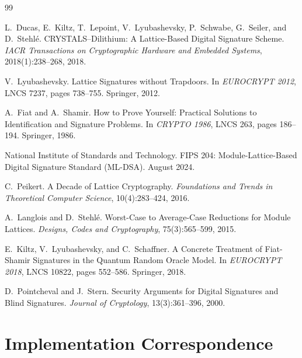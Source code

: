 \documentclass[11pt,a4paper]{article}
\theoremstyle{definition}
\begin{document}
\begin{thebibliography}{99}

L.~Ducas, E.~Kiltz, T.~Lepoint, V.~Lyubashevsky, P.~Schwabe, G.~Seiler, and D.~Stehl\'{e}.
\newblock CRYSTALS--Dilithium: A Lattice-Based Digital Signature Scheme.
\newblock \textit{IACR Transactions on Cryptographic Hardware and Embedded Systems}, 2018(1):238--268, 2018.

V.~Lyubashevsky.
\newblock Lattice Signatures without Trapdoors.
\newblock In \textit{EUROCRYPT 2012}, LNCS 7237, pages 738--755. Springer, 2012.

A.~Fiat and A.~Shamir.
\newblock How to Prove Yourself: Practical Solutions to Identification and Signature Problems.
\newblock In \textit{CRYPTO 1986}, LNCS 263, pages 186--194. Springer, 1986.

National Institute of Standards and Technology.
\newblock FIPS 204: Module-Lattice-Based Digital Signature Standard (ML-DSA).
\newblock August 2024.

C.~Peikert.
\newblock A Decade of Lattice Cryptography.
\newblock \textit{Foundations and Trends in Theoretical Computer Science}, 10(4):283--424, 2016.

A.~Langlois and D.~Stehl\'{e}.
\newblock Worst-Case to Average-Case Reductions for Module Lattices.
\newblock \textit{Designs, Codes and Cryptography}, 75(3):565--599, 2015.

E.~Kiltz, V.~Lyubashevsky, and C.~Schaffner.
\newblock A Concrete Treatment of Fiat-Shamir Signatures in the Quantum Random Oracle Model.
\newblock In \textit{EUROCRYPT 2018}, LNCS 10822, pages 552--586. Springer, 2018.

D.~Pointcheval and J.~Stern.
\newblock Security Arguments for Digital Signatures and Blind Signatures.
\newblock \textit{Journal of Cryptology}, 13(3):361--396, 2000.

\end{thebibliography}

\appendix

\section{Implementation Correspondence}
\label{app:impl}
\end{document}
